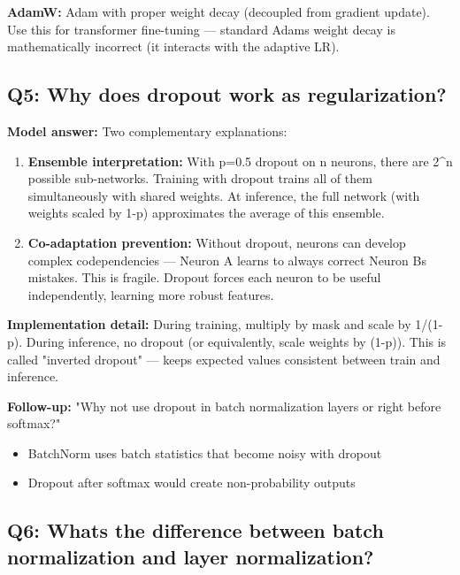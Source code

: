 \documentclass[11pt]{article}
\providecommand{\tightlist}{\setlength{\itemsep}{1pt}\setlength{\parskip}{0pt}}
\begin{document}
\textbf{AdamW:} Adam with proper weight decay (decoupled from gradient update). Use this for transformer fine-tuning --- standard Adam\textquotesingle s weight decay is mathematically incorrect (it interacts with the adaptive LR).

\subsection{Q5: Why does dropout work as regularization?}\label{q5-why-does-dropout-work-as-regularization}

\textbf{Model answer:}
Two complementary explanations:

\begin{enumerate}
\def\labelenumi{\arabic{enumi}.}
\item
  \textbf{Ensemble interpretation:} With p=0.5 dropout on n neurons, there are 2\^{}n possible sub-networks. Training with dropout trains all of them simultaneously with shared weights. At inference, the full network (with weights scaled by 1-p) approximates the average of this ensemble.
\item
  \textbf{Co-adaptation prevention:} Without dropout, neurons can develop complex codependencies --- Neuron A learns to always correct Neuron B\textquotesingle s mistakes. This is fragile. Dropout forces each neuron to be useful independently, learning more robust features.
\end{enumerate}

\textbf{Implementation detail:} During training, multiply by mask and scale by 1/(1-p). During inference, no dropout (or equivalently, scale weights by (1-p)). This is called "inverted dropout" --- keeps expected values consistent between train and inference.

\textbf{Follow-up:} "Why not use dropout in batch normalization layers or right before softmax?"

\begin{itemize}
\tightlist
\item
  BatchNorm uses batch statistics that become noisy with dropout
\item
  Dropout after softmax would create non-probability outputs
\end{itemize}

\subsection{Q6: What\textquotesingle s the difference between batch normalization and layer normalization?}\label{q6-whats-the-difference-between-batch-normalization-and-layer-normalization}
\end{document}
